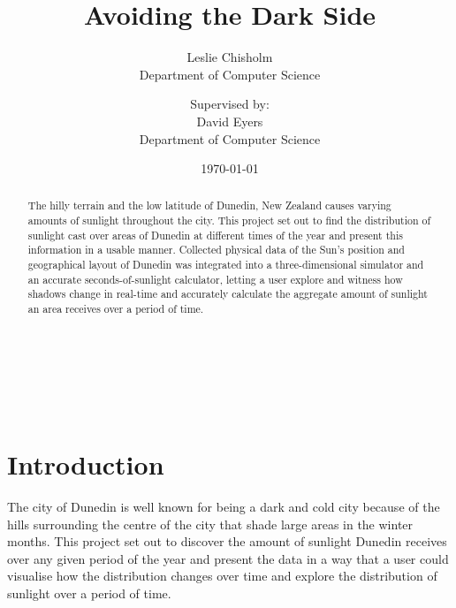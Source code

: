 \documentclass[12pt]{report}
\title{Avoiding the Dark Side}
\author{
        Leslie Chisholm \\
                Department of Computer Science\\
                \and
                Supervised by:\\
                David Eyers\\
                Department of Computer Science\\
}
\date{\today}
\newcommand{\note}[1]{}
\newcommand{\notedme}[1]{}
\begin{document}
\maketitle


\begin{abstract}
\notedme{Thanks for the chapter title changes - I really do think they're better like you've made them! The same can be said for subsections like ``Sun'' though... ;-)}\note{ok I've changed the Sun subsection }

\notedme{Did the ``suburb'' masking code end up making it? I don't think the figures show anything but sun over the whole area. It would be great to have a table that shows a quantitive difference between Peninsula and North Valley sunlight over June, for example. Even if the code was nearly ready but not finished, it might be worth mentioning it, as being able to quantitatively compare the amount of sun between selected areas of the map would be a good extension.}
\note{It ``sort of'' made it in. To find the aggregate amount of sunlight a suburb receives you can mask out sections of map that are outside of the suburb and they won't be returned. Exporting this to a CVS file and taking the average sunlight of that area would be the ideal way to do it and could be compared to other sections. I've created a section in the aggregator describing comparisons between suburbs.}

\notedme{I didn't spell-check, but make sure you do before submitting it, obviously.}\note{Spell check done}

The hilly terrain and the low latitude of Dunedin, New Zealand causes varying amounts of sunlight throughout the city. This project set out to find the distribution of sunlight cast over areas of Dunedin at different times of the year and present this information in a usable manner. Collected physical data of the Sun's position and geographical layout of Dunedin was integrated into a three-dimensional simulator and an accurate seconds-of-sunlight calculator, letting a user explore and witness how shadows change in real-time and accurately calculate the aggregate amount of sunlight an area receives over a period of time.
\end{abstract}

\tableofcontents
\listoffigures\
\listoftables\
\listofalgorithms
\chapter{Introduction}
The city of Dunedin is well known for being a dark and cold city because of the hills surrounding the centre of the city that shade large areas in the winter months. This project set out to discover the amount of sunlight Dunedin receives over any given period of the year and present the data in a way that a user could visualise how the distribution changes over time and explore the distribution of sunlight over a period of time.
\end{document}
